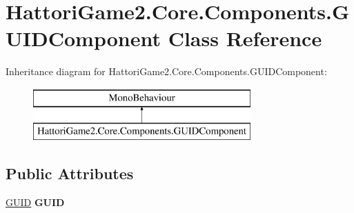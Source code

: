 \hypertarget{class_hattori_game2_1_1_core_1_1_components_1_1_g_u_i_d_component}{}\section{Hattori\+Game2.\+Core.\+Components.\+G\+U\+I\+D\+Component Class Reference}
\label{class_hattori_game2_1_1_core_1_1_components_1_1_g_u_i_d_component}
Inheritance diagram for Hattori\+Game2.\+Core.\+Components.\+G\+U\+I\+D\+Component\+:\begin{figure}[H]
\begin{center}
\leavevmode
\includegraphics[height=2.000000cm]{class_hattori_game2_1_1_core_1_1_components_1_1_g_u_i_d_component}
\end{center}
\end{figure}
\subsection*{Public Attributes}
\begin{DoxyCompactItemize}
\item 
\hypertarget{class_hattori_game2_1_1_core_1_1_components_1_1_g_u_i_d_component_ac84da292cf24255cd912e4a6b38522ea}{}\hyperlink{struct_hattori_game2_1_1_core_1_1_g_u_i_d}{G\+U\+I\+D} {\bfseries G\+U\+I\+D}\label{class_hattori_game2_1_1_core_1_1_components_1_1_g_u_i_d_component_ac84da292cf24255cd912e4a6b38522ea}

\end{DoxyCompactItemize}
